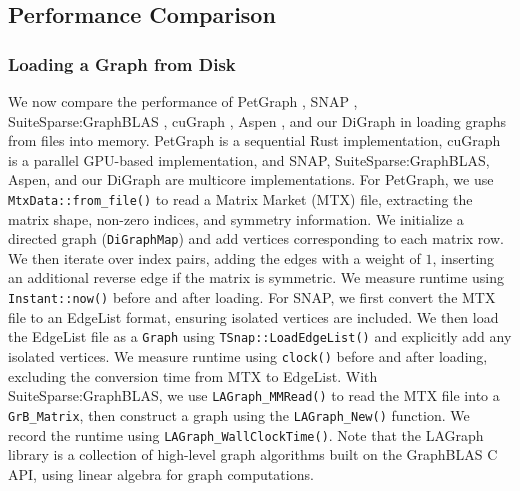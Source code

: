 




\subsection{Performance Comparison}
\label{sec:performance-comparison}  

\subsubsection{Loading a Graph from Disk}

We now compare the performance of PetGraph \cite{sverdrup2025petgraph}, SNAP \cite{leskovec2016snap}, SuiteSparse:GraphBLAS \cite{davis2023algorithm, davis2019algorithm}, cuGraph \cite{kang2023cugraph}, Aspen \cite{dhulipala2019low}, and our DiGraph in loading graphs from files into memory. PetGraph is a sequential Rust implementation, cuGraph is a parallel GPU-based implementation, and SNAP, SuiteSparse:GraphBLAS, Aspen, and our DiGraph are multicore implementations. For PetGraph, we use \texttt{MtxData::from\_file()} to read a Matrix Market (MTX) file, extracting the matrix shape, non-zero indices, and symmetry information. We initialize a directed graph (\texttt{DiGraphMap}) and add vertices corresponding to each matrix row. We then iterate over index pairs, adding the edges with a weight of $1$, inserting an additional reverse edge if the matrix is symmetric. We measure runtime using \texttt{Instant::now()} before and after loading. For SNAP, we first convert the MTX file to an EdgeList format, ensuring isolated vertices are included. We then load the EdgeList file as a \texttt{Graph} using \texttt{TSnap::LoadEdgeList()} and explicitly add any isolated vertices. We measure runtime using \texttt{clock()} before and after loading, excluding the conversion time from MTX to EdgeList. With SuiteSparse:GraphBLAS, we use \texttt{LAGraph\_MMRead()} to read the MTX file into a \texttt{GrB\_Matrix}, then construct a graph using the \texttt{LAGraph\_New()} function. We record the runtime using \texttt{LAGraph\_WallClockTime()}. Note that the LAGraph library is a collection of high-level graph algorithms built on the GraphBLAS C API, using linear algebra for graph computations.

